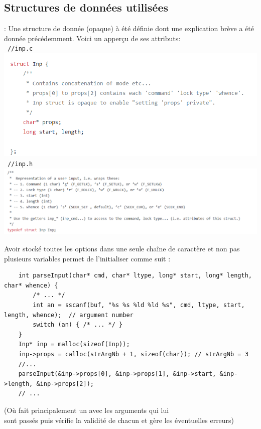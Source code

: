 %

\subsection{Structures de données utilisées}
  \begin{frame}[fragile]{\sn : \ssn}
     Une structure de donnée (opaque)  à été définie dont une explication brève a été donnée précédemment.
    Voici un apperçu de ses attributs:\\
    \lstinline{ //inp.c}\\
    \vspace{-0.05cm}
    \includegraphics[scale=0.6]{images/inp-struct.png}\\

    \vspace{-0.3cm}
    \lstinline{ //inp.h}\\
    \vspace{-0.05cm}
    \includegraphics[scale=0.55]{images/inp-structh.png}
  \end{frame}


\begin{frame}[fragile]{\sn}
    
Avoir stocké toutes les options dans une seule chaîne de caractère et non pas plusieurs variables permet de l'initialiser comme suit :\\

\begin{lstlisting}
    int parseInput(char* cmd, char* ltype, long* start, long* length, char* whence) {
        /* ... */
        int an = sscanf(buf, "%s %s %ld %ld %s", cmd, ltype, start, length, whence);  // argument number
        switch (an) { /* ... */ }
    }
    Inp* inp = malloc(sizeof(Inp));
    inp->props = calloc(strArgNb + 1, sizeof(char)); // strArgNb = 3
    //...
    parseInput(&inp->props[0], &inp->props[1], &inp->start, &inp->length, &inp->props[2]);
    // ...

\end{lstlisting}

{\footnotesize 
 (Où  fait principalement un  avec les arguments qui lui\\ sont passés puis vérifie la validité de chacun et gère les éventuelles erreurs)
}
\end{frame}


